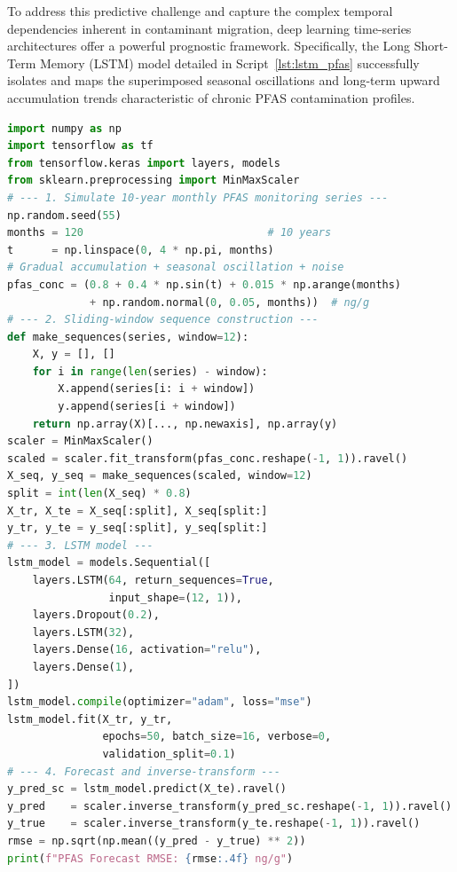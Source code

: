 \documentclass[environments,article,submit,pdftex,moreauthors]{Definitions/mdpi}
\begin{document}
To address this predictive challenge and capture the complex temporal dependencies inherent in contaminant migration, deep learning time-series architectures offer a powerful prognostic framework. Specifically, the Long Short-Term Memory (LSTM) model detailed in Script~\ref{lst:lstm_pfas} successfully isolates and maps the superimposed seasonal oscillations and long-term upward accumulation trends characteristic of chronic PFAS contamination profiles. 

\begin{lstlisting}[language=Python,basicstyle=\scriptsize\ttfamily,
    caption={Python workflow: LSTM network for PFAS concentration
             time-series forecasting and long-term trend detection
             (Script~4).},
    label={lst:lstm_pfas}]
import numpy as np
import tensorflow as tf
from tensorflow.keras import layers, models
from sklearn.preprocessing import MinMaxScaler
# --- 1. Simulate 10-year monthly PFAS monitoring series ---
np.random.seed(55)
months = 120                             # 10 years
t      = np.linspace(0, 4 * np.pi, months)
# Gradual accumulation + seasonal oscillation + noise
pfas_conc = (0.8 + 0.4 * np.sin(t) + 0.015 * np.arange(months)
             + np.random.normal(0, 0.05, months))  # ng/g
# --- 2. Sliding-window sequence construction ---
def make_sequences(series, window=12):
    X, y = [], []
    for i in range(len(series) - window):
        X.append(series[i: i + window])
        y.append(series[i + window])
    return np.array(X)[..., np.newaxis], np.array(y)
scaler = MinMaxScaler()
scaled = scaler.fit_transform(pfas_conc.reshape(-1, 1)).ravel()
X_seq, y_seq = make_sequences(scaled, window=12)
split = int(len(X_seq) * 0.8)
X_tr, X_te = X_seq[:split], X_seq[split:]
y_tr, y_te = y_seq[:split], y_seq[split:]
# --- 3. LSTM model ---
lstm_model = models.Sequential([
    layers.LSTM(64, return_sequences=True,
                input_shape=(12, 1)),
    layers.Dropout(0.2),
    layers.LSTM(32),
    layers.Dense(16, activation="relu"),
    layers.Dense(1),
])
lstm_model.compile(optimizer="adam", loss="mse")
lstm_model.fit(X_tr, y_tr,
               epochs=50, batch_size=16, verbose=0,
               validation_split=0.1)
# --- 4. Forecast and inverse-transform ---
y_pred_sc = lstm_model.predict(X_te).ravel()
y_pred    = scaler.inverse_transform(y_pred_sc.reshape(-1, 1)).ravel()
y_true    = scaler.inverse_transform(y_te.reshape(-1, 1)).ravel()
rmse = np.sqrt(np.mean((y_pred - y_true) ** 2))
print(f"PFAS Forecast RMSE: {rmse:.4f} ng/g")
\end{lstlisting}
\end{document}
